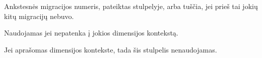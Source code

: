 \documentclass[letterpaper,10pt,lithuanian]{sphinxmanual}
\begin{document}

\begin{fulllineitems}
\label{\detokenize{dimensijos:migrate.ref}}
\pysigstartsignatures
\pysigline
{}
\pysigstopsignatures
\sphinxAtStartPar
Ankstesnės migracijos numeris, pateiktas {\hyperref[\detokenize{dimensijos:migrate.id}]{}} stulpelyje,
arba tuščia, jei prieš tai jokių kitų migracijų nebuvo.

\sphinxAtStartPar
Naudojamas jei {\hyperref[\detokenize{dimensijos:module-migrate}]{}} nepatenka į jokios dimensijos kontekstą.

\sphinxAtStartPar
Jei {\hyperref[\detokenize{dimensijos:module-migrate}]{}} aprašomas dimensijos kontekste, tada šis stulpelis
nenaudojamas.

\end{fulllineitems}

\end{document}
